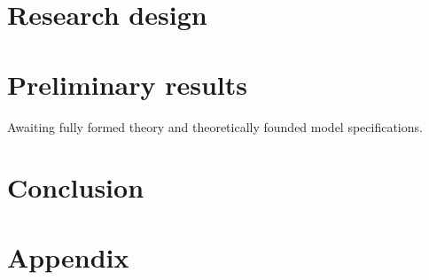 \documentclass[12pt]{article}
\begin{document}
\section{Research design}

\section{Preliminary results}

Awaiting fully formed theory and theoretically founded model specifications.

\section{Conclusion}

\pagebreak




\section*{Appendix}
\end{document}
